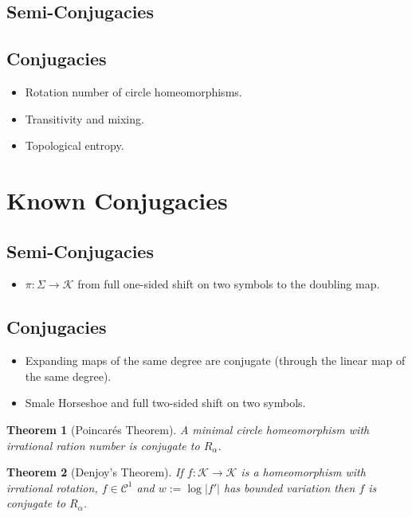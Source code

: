 \documentclass[11pt]{article}
\newcommand{\defeq}{:=}
\newcommand{\abs}[1]{|#1|}
\newtheorem{theorem}{Theorem}[section]
\begin{document}
\subsection{Semi-Conjugacies}

\subsection{Conjugacies}

\begin{itemize}
	\item Rotation number of circle homeomorphisms.
	\item Transitivity and mixing.
	\item Topological entropy.
\end{itemize}

\section{Known Conjugacies}

\subsection{Semi-Conjugacies}

\begin{itemize}
	\item $\pi:\Sigma\to\mathcal{K}$ from full one-sided shift on two symbols to the doubling map.
\end{itemize}

\subsection{Conjugacies}

\begin{itemize}
	\item Expanding maps of the same degree are conjugate (through the linear map of the same degree).
	\item Smale Horseshoe and full two-sided shift on two symbols.
\end{itemize}

\begin{theorem}[Poincar\'es Theorem]
A minimal circle homeomorphism with irrational ration number is conjugate to $R_\alpha$.
\end{theorem}

\begin{theorem}[Denjoy's Theorem]
If $f:\mathcal{K}\to\mathcal{K}$ is a homeomorphism with irrational rotation, $f\in\mathcal{C}^1$ and $w\defeq \log\abs{f'}$ has bounded variation then $f$ is conjugate to $R_\alpha$.
\end{theorem}
\end{document}
